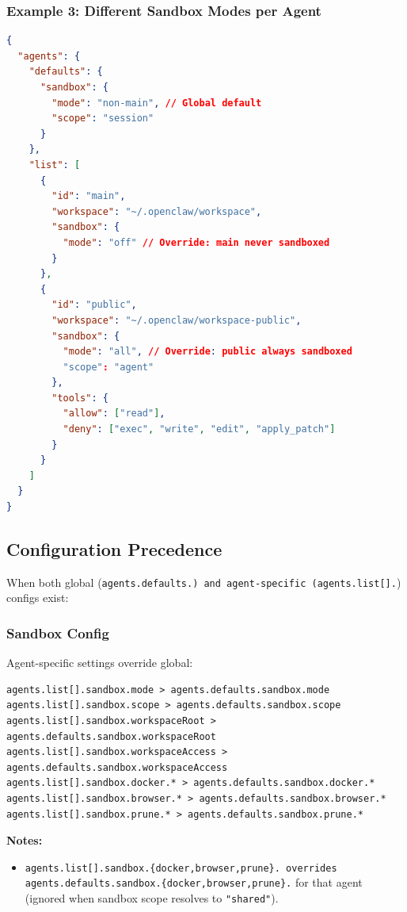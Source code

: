 \subsubsection{Example 3: Different Sandbox Modes per Agent}


\begin{lstlisting}[language=json]
{
  "agents": {
    "defaults": {
      "sandbox": {
        "mode": "non-main", // Global default
        "scope": "session"
      }
    },
    "list": [
      {
        "id": "main",
        "workspace": "~/.openclaw/workspace",
        "sandbox": {
          "mode": "off" // Override: main never sandboxed
        }
      },
      {
        "id": "public",
        "workspace": "~/.openclaw/workspace-public",
        "sandbox": {
          "mode": "all", // Override: public always sandboxed
          "scope": "agent"
        },
        "tools": {
          "allow": ["read"],
          "deny": ["exec", "write", "edit", "apply_patch"]
        }
      }
    ]
  }
}
\end{lstlisting}


\hrulefill


\subsection{Configuration Precedence}


When both global (\texttt{agents.defaults.\textit{}) and agent-specific (\texttt{agents.list[].}}) configs exist:

\subsubsection{Sandbox Config}


Agent-specific settings override global:

\begin{lstlisting}
agents.list[].sandbox.mode > agents.defaults.sandbox.mode
agents.list[].sandbox.scope > agents.defaults.sandbox.scope
agents.list[].sandbox.workspaceRoot > agents.defaults.sandbox.workspaceRoot
agents.list[].sandbox.workspaceAccess > agents.defaults.sandbox.workspaceAccess
agents.list[].sandbox.docker.* > agents.defaults.sandbox.docker.*
agents.list[].sandbox.browser.* > agents.defaults.sandbox.browser.*
agents.list[].sandbox.prune.* > agents.defaults.sandbox.prune.*
\end{lstlisting}


\textbf{Notes:}

\begin{itemize}
  \item \texttt{agents.list[].sandbox.\{docker,browser,prune\}.\textit{} overrides \texttt{agents.defaults.sandbox.\{docker,browser,prune\}.}} for that agent (ignored when sandbox scope resolves to \texttt{"shared"}).
\end{itemize}


